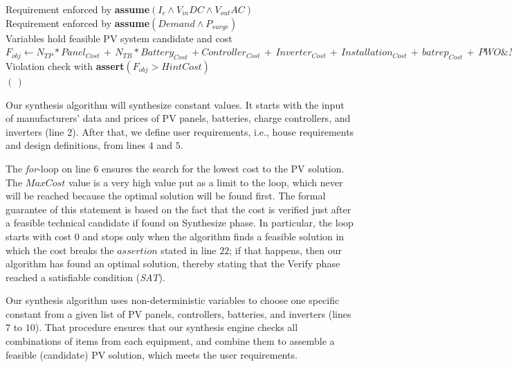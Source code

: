 \documentclass[journal]{IEEEtran}
\begin{document}
\begin{algorithm}
\begin{algorithmic}[1]
 	\STATE Requirement enforced by \textbf{assume}$(I_{c} \wedge V_{in}DC \wedge V_{out}AC)$ \\
	\STATE Requirement enforced by \textbf{assume}$(Demand \wedge P_{surge})$ \\
	\STATE Variables hold feasible PV system candidate and cost  \\
	\STATE $F_{obj} \leftarrow  N_{TP}*Panel_{Cost} \, + \, N_{TB}*Battery_{Cost} \, + Controller_{Cost} \, + \, Inverter_{Cost} \, + \, Installation_{Cost} \, + \, batrep_{Cost} \, + \, PWO\&M_{Cost}$ \\
	\STATE Violation check with \textbf{assert}$(F_{obj} > HintCost)$ \\
  \ENDFOR
 \RETURN $(\,)$ 
 \end{algorithmic} 
 \label{alg:verification-algorithm}
 \end{algorithm}
%
Our synthesis algorithm will synthesize constant values. It starts with the input of manufacturers' data and prices of PV panels, batteries, charge controllers, and inverters (line $2$). After that, we define user requirements, i.e., house requirements and design definitions, from lines $4$ and $5$. 

The \textit{for}-loop on line 6 ensures the search for the lowest cost to the PV solution. The $MaxCost$ value is a very high value put as a limit to the loop, which never will be reached because the optimal solution will be found first. The formal guarantee of this statement is based on the fact that the cost is verified just after a feasible technical candidate if found on {\sc Synthesize} phase. 
In particular, the loop starts with cost $0$ and stops only when the algorithm finds a feasible solution in which the cost breaks the $assertion$ stated in line $22$; if that happens, then our algorithm has found an optimal solution, thereby stating that the {\sc Verify} phase reached a satisfiable condition (\textit{SAT}).

Our synthesis algorithm uses non-deterministic variables to choose one specific constant from a given list of PV panels, controllers, batteries, and inverters (lines $7$ to $10$). That procedure ensures that our synthesis engine checks all combinations of items from each equipment, and combine them to assemble a feasible (candidate) PV solution, which meets the user requirements.
\end{document}
